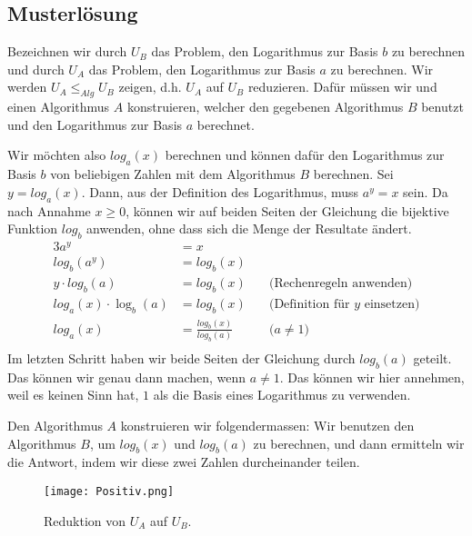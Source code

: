 \documentclass[
	12pt, %
	german, %
]{fphw}
\begin{document}

\subsection*{Musterlösung}

Bezeichnen wir durch \(U_B\) das Problem, den Logarithmus zur Basis \(b\) zu berechnen und durch \(U_A\) das Problem, den Logarithmus zur Basis \(a\) zu berechnen. Wir werden \(U_A \leq_{Alg} U_B\) zeigen, d.h. \(U_A\) auf \(U_B\) reduzieren. Dafür müssen wir und einen Algorithmus \(A\) konstruieren, welcher den gegebenen Algorithmus \(B\) benutzt und den Logarithmus zur Basis \(a\) berechnet.

Wir möchten also \(log_a(x)\) berechnen und können dafür den Logarithmus zur Basis \(b\) von beliebigen Zahlen mit dem Algorithmus \(B\) berechnen. Sei \(y = log_a(x)\). Dann, aus der Definition des Logarithmus, muss \(a^y = x\) sein. Da nach Annahme \(x \geq 0 \), können wir auf beiden Seiten der Gleichung die bijektive Funktion \(log_b\) anwenden, ohne dass sich die Menge der Resultate ändert.
\begin{alignat*}{3}
a^y &= x & \\
log_b(a^y) &= log_b(x) & \\
y \cdot log_b(a) &= log_b(x) & \quad \text{(Rechenregeln anwenden)} \\
log_a(x) \cdot \log_b(a) &= log_b(x) & \quad \text{(Definition für \(y\) einsetzen)}\\
log_a(x) &= \frac{log_b(x)}{log_b(a)} & \quad \text{(\(a \neq 1\))}\\
\end{alignat*}
Im letzten Schritt haben wir beide Seiten der Gleichung durch \(log_b(a)\) geteilt. Das können wir genau dann machen, wenn \(a \neq 1\). Das können wir hier annehmen, weil es keinen Sinn hat, \(1\) als die Basis eines Logarithmus zu verwenden.

Den Algorithmus \(A\) konstruieren wir folgendermassen: Wir benutzen den Algorithmus \(B\), um \(log_b(x)\) und \(log_b(a)\) zu berechnen, und dann ermitteln wir die Antwort, indem wir diese zwei Zahlen durcheinander teilen.

\begin{figure}[H]
	\centering
	\texttt{[image: Positiv.png]}
	\caption{Reduktion von \(U_A\) auf \(U_B\).}
\end{figure}

\end{document}
